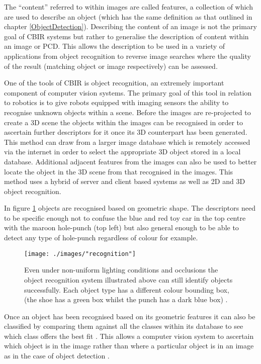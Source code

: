 The ``content'' referred to within images are called features, a collection of which are used to describe an object (which has the same definition as that outlined in chapter \ref{ObjectDetection}). Describing the content of an image is not the primary goal of CBIR systems but rather to generalise the description of content within an image or PCD. This allows the description to be used in a variety of applications from object recognition to reverse image searches where the quality of the result (matching object or image respectively) can be assessed. 

One of the tools of CBIR is object recognition, an extremely important component of computer vision systems. The primary goal of this tool in relation to robotics is to give robots equipped with imaging sensors the ability to recognise unknown objects within a scene. Before the images are re-projected to create a 3D scene the objects within the images can be recognised in order to ascertain further descriptors for it once its 3D counterpart has been generated. This method can draw from a larger image database which is remotely accessed via the internet in order to select the appropriate 3D object stored in a local database. Additional adjacent features from the images can also be used to better locate the object in the 3D scene from that recognised in the images. This method uses a hybrid of server and client based systems as well as 2D and 3D object recognition. 

In figure \ref{objectrecog} objects are recognised based on geometric shape. The descriptors need to be specific enough not to confuse the blue and red toy car in the top centre with the maroon hole-punch (top left) but also general enough to be able to detect any type of hole-punch regardless of colour for example.

\begin{figure}[ht!]
	\centering
	\texttt{[image: ./images/"recognition"]}
	\caption[Object recognition under non-uniform lighting conditions and occlusions]{Even under non-uniform lighting conditions and occlusions the object recognition system illustrated above can still identify objects successfully. Each object type has a different colour bounding box, (the shoe has a green box whilst the punch has a dark blue box) \citep{bormann_innovative_2014}.
		\label{objectrecog}}
\end{figure}

Once an object has been recognised based on its geometric features it can also be classified by comparing them against all the classes within its database to see which class offers the best fit \citep{lai_rgb-d_2013}. This allows a computer vision system to ascertain which object is in the image rather than where a particular object is in an image as in the case of object detection \citep{penelope_image_2013}. 

